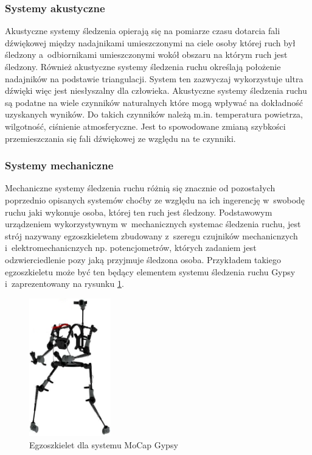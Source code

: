 \subsubsection*{Systemy akustyczne}
Akustyczne systemy śledzenia opierają się na pomiarze czasu dotarcia fali dźwiękowej między nadajnikami umieszczonymi na ciele osoby której ruch był śledzony a~odbiornikami umieszczonymi wokół obszaru na którym ruch jest śledzony. Również akustyczne systemy śledzenia ruchu określają położenie nadajników na podstawie triangulacji. System ten zazwyczaj wykorzystuje ultra dźwięki więc jest niesłyszalny dla człowieka. Akustyczne systemy śledzenia ruchu są podatne na wiele czynników naturalnych które mogą wpływać na dokładność uzyskanych wyników. Do takich czynników należą m.in. temperatura powietrza, wilgotność, ciśnienie atmosferyczne. Jest to spowodowane zmianą szybkości przemieszczania się fali dźwiękowej ze względu na te czynniki.

\subsubsection*{Systemy mechaniczne}
Mechaniczne systemy śledzenia ruchu różnią się znacznie od pozostałych poprzednio opisanych systemów choćby ze względu na ich ingerencję w~swobodę ruchu jaki wykonuje osoba, której ten ruch jest śledzony. Podstawowym urządzeniem wykorzystywnym w~mechanicznych systemac śledzenia ruchu, jest strój nazywany egzoszkieletem zbudowany z~szeregu czujników mechanicnzych i~elektromechanicnzych np. potencjometrów, których zadaniem jest odzwierciedlenie pozy jaką przyjmuje śledzona osoba. Przykładem takiego egzoszkieletu może być ten będący elementem systemu śledzenia ruchu Gypsy \cite{gypsy} i~zaprezentowany na rysunku \ref{fig:literature:gypsy:full}.

\begin{figure}[!htp]
	\centering	
	\includegraphics[height=6cm]{images/gypsy7_full.jpg}
	\caption{Egzoszkielet dla systemu MoCap Gypsy}	
	\label{fig:literature:gypsy:full}
\end{figure}

